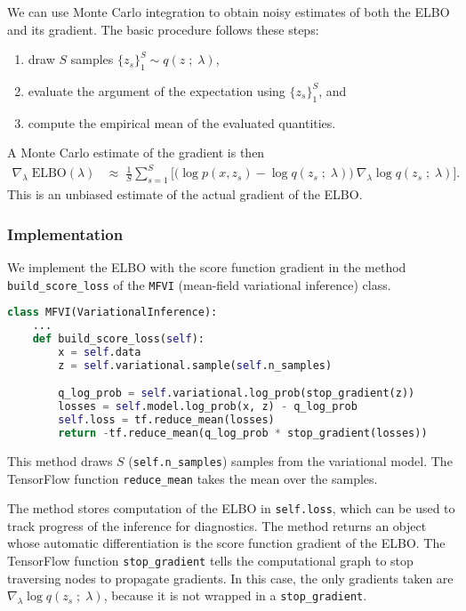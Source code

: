 We can use Monte Carlo integration to obtain noisy estimates of both the ELBO
and its gradient. The basic procedure follows these steps:
\begin{enumerate}
  \item draw $S$ samples $\{z_s\}_1^S \sim q(z\;;\;\lambda)$,
  \item evaluate the argument of the expectation using $\{z_s\}_1^S$, and
  \item compute the empirical mean of the evaluated quantities.
\end{enumerate}

A Monte Carlo estimate of the gradient is then
\begin{align*}
  \nabla_\lambda\;
  \text{ELBO}(\lambda)
  &\approx\;
  \frac{1}{S}
  \sum_{s=1}^{S}
  \big[
  \big(
  \log p(x, z_s)
  -
  \log q(z_s\;;\;\lambda)
  \big)
  \:
  \nabla_\lambda \log q(z_s\;;\;\lambda)
  \big].
\end{align*}
This is an unbiased estimate of the actual gradient of the ELBO.

\subsubsection{Implementation}

We implement the ELBO with the score function gradient in the method
\texttt{build_score_loss} of the \texttt{MFVI} (mean-field variational
inference) class.
\begin{lstlisting}[language=Python]
class MFVI(VariationalInference):
    ...
    def build_score_loss(self):
        x = self.data
        z = self.variational.sample(self.n_samples)

        q_log_prob = self.variational.log_prob(stop_gradient(z))
        losses = self.model.log_prob(x, z) - q_log_prob
        self.loss = tf.reduce_mean(losses)
        return -tf.reduce_mean(q_log_prob * stop_gradient(losses))
\end{lstlisting}

This method draws $S$ (\texttt{self.n_samples}) samples from the variational
model. The TensorFlow function \texttt{reduce_mean} takes the
mean over the samples.

The method stores computation of the ELBO in \texttt{self.loss}, which
can be used to track progress of the inference for diagnostics.
The method returns an object whose automatic differentiation is the
score function gradient of the ELBO.  The TensorFlow function
\texttt{stop_gradient} tells the computational graph to stop
traversing nodes to propagate gradients. In this case,
the only gradients taken are $\nabla_\lambda \log q(z_s\;;\;\lambda)$,
because it is not wrapped in a \texttt{stop_gradient}.

